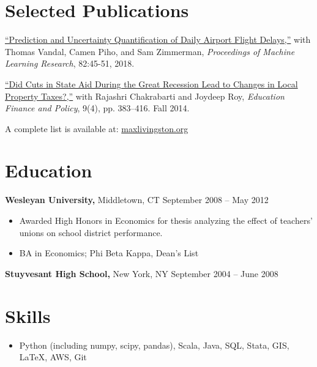 \documentclass{res}
\begin{document}
\begin{resume}
  \section{Selected Publications} 
  \href{http://proceedings.mlr.press/v82/vandal18a.html}{``Prediction and Uncertainty Quantification of Daily Airport Flight Delays,''} with Thomas Vandal, Camen Piho, and Sam Zimmerman, {\it Proceedings of Machine Learning Research}, 82:45-51, 2018.

  \href{http://bit.ly/20jcEax}{``Did Cuts in State Aid During the Great Recession Lead to Changes in Local Property Taxes?,''} with Rajashri Chakrabarti and Joydeep Roy, {\it Education Finance and Policy}, 9(4), pp. 383--416. Fall 2014.



  A complete list is available at: \href{http://maxlivingston.org}{maxlivingston.org}

\section{Education} 
  {\bf Wesleyan University,} Middletown, CT \hfill September 2008 -- May 2012
  \begin{itemize} \itemsep -2pt
  \item Awarded High Honors in Economics for thesis analyzing the effect of teachers' unions on school district performance.
  \item BA in Economics; Phi Beta Kappa, Dean's List
  \end{itemize}

  {\bf Stuyvesant High School,} New York, NY \hfill September 2004 -- June 2008

  \section{Skills}
  \begin{itemize} \itemsep -2pt
  \item Python (including numpy, scipy, pandas), Scala, Java, SQL, Stata, GIS, \LaTeX, AWS, Git
  \end{itemize}

\end{resume} 
\end{document}
